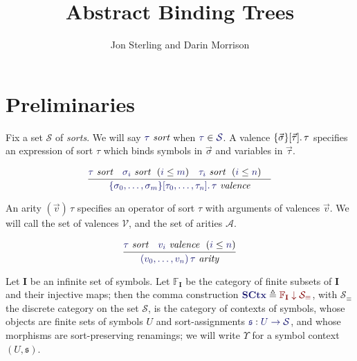 \documentclass[11pt]{article}
\theoremstyle{definition}
\theoremstyle{remark}
\numberwithin{equation}{section}
\def\IModeColorName{MidnightBlue}
\def\OModeColorName{Maroon}
\newcommand\IMode[1]{{\color{\IModeColorName}{#1}}}
\newcommand\OMode[1]{{\color{\OModeColorName}{#1}}}
\newcommand\HypJ[2]{#1\ \ (#2)}
\newcommand\Member[2]{\IMode{#1}\in\IMode{#2}}
\newcommand\Of[2]{\IMode{#1}: \IMode{#2}}
\newcommand\MkValence[3]{%
  \ifthenelse{\equal{#1}{}}{}{%
    \{#1\}%
  }%
  \ifthenelse{\equal{#2}{}}{}{%
    [#2]%
  }.\, #3%
}
\newcommand\MkArity[2]{(#1)\, #2}
\newcommand\IsArity[1]{\IMode{#1}\ \textit{arity}}
\newcommand\IsValence[1]{\IMode{#1}\ \textit{valence}}
\newcommand\IsSort[1]{\IMode{#1}\ \textit{sort}}
\newcommand\Leq[2]{\IMode{#1}\leq\IMode{#2}}
\newcommand\Symbols{\mathbf{I}}
\newcommand\SymSets{\mathbb{F}_\Symbols}
\newcommand\Sorts{\mathcal{S}}
\newcommand\Valences{\mathcal{V}}
\newcommand\Arities{\mathcal{A}}
\newcommand\Discrete[1]{#1_{\equiv}}
\newcommand\SCtx{\mathbf{SCtx}}
\newcommand\Comma[2]{#1 \downarrow#2}
\newcommand\Define[2]{\IMode{#1}\triangleq\OMode{#2}}
\begin{document}
\title{Abstract Binding Trees}
\date{}
\author{Jon Sterling and Darin Morrison}
\maketitle

\section{Preliminaries}

Fix a set $\Sorts$ of \emph{sorts}. We will say $\IsSort{\tau}$ when
$\Member{\tau}{\Sorts}$. A valence $\MkValence{\vec{\sigma}}{\vec{\tau}}{\tau}$ specifies an
expression of sort $\tau$ which binds symbols in $\vec{\sigma}$ and variables in
$\vec{\tau}$.

\[
  \infer{
    \IsValence{\MkValence{\sigma_0,\dots,\sigma_m}{\tau_0,\dots,\tau_n}{\tau}}
  }{
    \IsSort{\tau} &
    \HypJ{\IsSort{\sigma_i}}{\Leq{i}{m}} &
    \HypJ{\IsSort{\tau_i}}{\Leq{i}{n}} &
  }
\]

An arity $\MkArity{\vec{v}}{\tau}$ specifies an operator of sort $\tau$ with
arguments of valences $\vec{v}$. We will call the set of valences $\Valences$,
and the set of arities $\Arities$.

\[
  \infer{
    \IsArity{\MkArity{v_0,\ldots,v_n}{\tau}}
  }{
    \IsSort{\tau} &
    \HypJ{\IsValence{v_i}}{\Leq{i}{n}}
  }
\]


Let $\Symbols$ be an infinite set of symbols. Let $\SymSets$ be the category of
finite subsets of $\Symbols$ and their injective maps; then the comma
construction $\Define{\SCtx}{\Comma{\SymSets}{\Discrete{\Sorts}}}$, with
$\Discrete{\Sorts}$ the discrete category on the set $\mathcal{S}$, is the
category of contexts of symbols, whose objects are finite sets of symbols $U$
and sort-assignments $\Of{\mathfrak{s}}{U\to\Sorts}$, and whose morphisms are
sort-preserving renamings; we will write $\Upsilon$ for a symbol context
$(U,\mathfrak{s})$.
\end{document}
